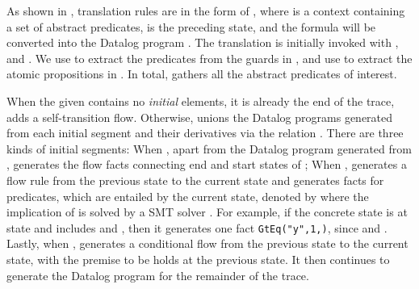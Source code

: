 







As shown in 
, 
translation rules are in the form of \code{\RETOD{\prevS}{\pathPure}{\effect}{\Datalog}}, where \code{\Pi} is a context containing a set of abstract predicates, \code{\prevS} is the preceding state, 
and the formula \code{\effect} will be converted into the Datalog program \code{\Datalog}. 
The translation is initially invoked with ,   and . 
We use  to extract the predicates from the guards in \code{\effect}, and use 
 to extract the atomic propositions in \code{\phi}. 
In total, \code{\Pi} gathers all the abstract predicates of interest. %


When the given \code{\effect} contains no \emph{initial} elements, \ie it is already the end of the trace, 
  adds a self-transition flow. 
Otherwise,  %
unions the Datalog programs generated from each initial segment and their derivatives via the relation . 
There are three kinds of initial segments: 
When , apart from the Datalog program generated from \code{\effect},   generates the flow facts 
connecting end and start states of \code{\effect}; 
When ,  generates a flow rule from the previous state %
to the current state %
and 
generates facts for predicates, which are entailed by the current state, 
denoted by  
where the implication of 
 is 
solved by a SMT solver \cite{DBLP:conf/tacas/MouraB08}. 
For example, if the concrete state is  at state  and \code{\Pi} includes  and , then it generates one fact \lstinline|GtEq("y",1,|\lstinline|)|, since  and . 
Lastly, when ,  generates a conditional flow from the previous state to the current state, with the premise to be \code{\pi} holds at the previous state. It then continues to generate the Datalog program for the remainder of the trace. 


